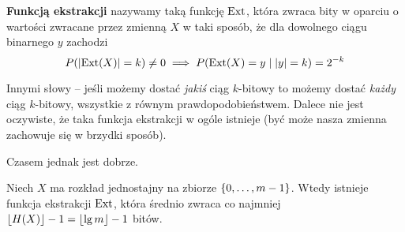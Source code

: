 \begin{definition}
    \textbf{Funkcją ekstrakcji} nazywamy taką funkcję \( \operatorname{Ext} \), która zwraca bity w oparciu o wartości zwracane przez zmienną \( X \) w taki sposób, że dla dowolnego ciągu binarnego \( y \) zachodzi
    \[
        P(\left\lvert\operatorname{Ext}(X)\right\rvert = k) \neq 0 \implies P(\operatorname{Ext}(X) = y \mid \left\lvert y\right\rvert = k) = 2^{-k}
    \]
\end{definition}
Innymi słowy -- jeśli możemy dostać \textit{jakiś} ciąg \( k \)-bitowy to możemy dostać \textit{każdy} ciąg \(k\)-bitowy, wszystkie z równym prawdopodobieństwem.
Dalece nie jest oczywiste, że taka funkcja ekstrakcji w ogóle istnieje (być może nasza zmienna zachowuje się w brzydki sposób).

Czasem jednak jest dobrze.
\begin{theorem}[Twierdzenie 10.4 P\&C]
    Niech \( X \) ma rozkład jednostajny na zbiorze \( \set{0, \dots, m - 1} \).
    Wtedy istnieje funkcja ekstrakcji \( \operatorname{Ext} \), która średnio zwraca co najmniej 
    \( \left\lfloor H(X)\right\rfloor - 1  = \left\lfloor\lg m\right\rfloor - 1\) bitów.
\end{theorem}
